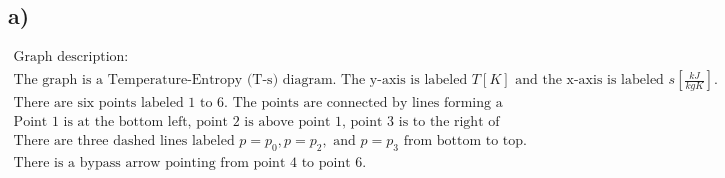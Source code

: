 

\subsection*{a)}
\[
\begin{array}{l}
\text{Graph description:} \\
\text{The graph is a Temperature-Entropy (T-s) diagram. The y-axis is labeled } T[K] \text{ and the x-axis is labeled } s \left[ \frac{kJ}{kgK} \right]. \\
\text{There are six points labeled 1 to 6. The points are connected by lines forming a closed loop.} \\
\text{Point 1 is at the bottom left, point 2 is above point 1, point 3 is to the right of point 2, point 4 is below point 3, point 5 is to the left of point 4, and point 6 is to the left of point 5.} \\
\text{There are three dashed lines labeled } p = p_0, p = p_2, \text{ and } p = p_3 \text{ from bottom to top.} \\
\text{There is a bypass arrow pointing from point 4 to point 6.}
\end{array}
\]